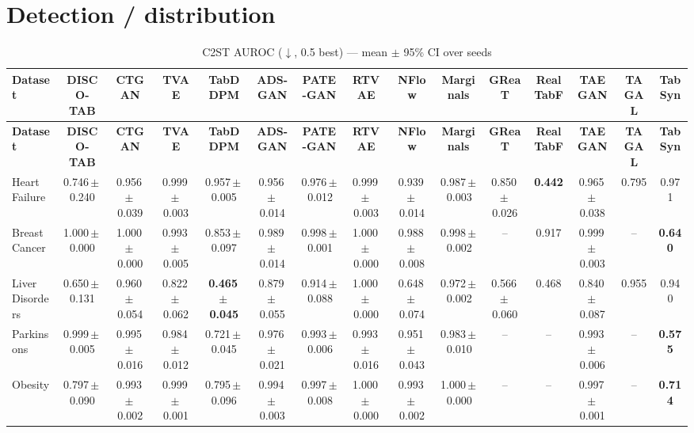 \documentclass[8pt]{extarticle}
\begin{document}
\section*{Detection / distribution}
\begin{longtable}{l*{14}{c}}
\caption{C2ST AUROC ($\downarrow$, 0.5 best) --- mean $\pm$ 95\% CI over seeds}\\
\toprule
\textbf{Dataset} & \textbf{DISCO-TAB} & \textbf{CTGAN} & \textbf{TVAE} & \textbf{TabDDPM} & \textbf{ADS-GAN} & \textbf{PATE-GAN} & \textbf{RTVAE} & \textbf{NFlow} & \textbf{Marginals} & \textbf{GReaT} & \textbf{RealTabF} & \textbf{TAEGAN} & \textbf{TAGAL} & \textbf{TabSyn} \\
\midrule
\endfirsthead
\toprule
\textbf{Dataset} & \textbf{DISCO-TAB} & \textbf{CTGAN} & \textbf{TVAE} & \textbf{TabDDPM} & \textbf{ADS-GAN} & \textbf{PATE-GAN} & \textbf{RTVAE} & \textbf{NFlow} & \textbf{Marginals} & \textbf{GReaT} & \textbf{RealTabF} & \textbf{TAEGAN} & \textbf{TAGAL} & \textbf{TabSyn} \\
\midrule
\endhead
\bottomrule
\endfoot
Heart Failure & 0.746\,$\pm$\,0.240 & 0.956\,$\pm$\,0.039 & 0.999\,$\pm$\,0.003 & 0.957\,$\pm$\,0.005 & 0.956\,$\pm$\,0.014 & 0.976\,$\pm$\,0.012 & 0.999\,$\pm$\,0.003 & 0.939\,$\pm$\,0.014 & 0.987\,$\pm$\,0.003 & 0.850\,$\pm$\,0.026 & \textbf{0.442} & 0.965\,$\pm$\,0.038 & 0.795 & 0.971 \\
Breast Cancer & 1.000\,$\pm$\,0.000 & 1.000\,$\pm$\,0.000 & 0.993\,$\pm$\,0.005 & 0.853\,$\pm$\,0.097 & 0.989\,$\pm$\,0.014 & 0.998\,$\pm$\,0.001 & 1.000\,$\pm$\,0.000 & 0.988\,$\pm$\,0.008 & 0.998\,$\pm$\,0.002 & -- & 0.917 & 0.999\,$\pm$\,0.003 & -- & \textbf{0.640} \\
Liver Disorders & 0.650\,$\pm$\,0.131 & 0.960\,$\pm$\,0.054 & 0.822\,$\pm$\,0.062 & \textbf{0.465\,$\pm$\,0.045} & 0.879\,$\pm$\,0.055 & 0.914\,$\pm$\,0.088 & 1.000\,$\pm$\,0.000 & 0.648\,$\pm$\,0.074 & 0.972\,$\pm$\,0.002 & 0.566\,$\pm$\,0.060 & 0.468 & 0.840\,$\pm$\,0.087 & 0.955 & 0.940 \\
Parkinsons & 0.999\,$\pm$\,0.005 & 0.995\,$\pm$\,0.016 & 0.984\,$\pm$\,0.012 & 0.721\,$\pm$\,0.045 & 0.976\,$\pm$\,0.021 & 0.993\,$\pm$\,0.006 & 0.993\,$\pm$\,0.016 & 0.951\,$\pm$\,0.043 & 0.983\,$\pm$\,0.010 & -- & -- & 0.993\,$\pm$\,0.006 & -- & \textbf{0.575} \\
Obesity & 0.797\,$\pm$\,0.090 & 0.993\,$\pm$\,0.002 & 0.999\,$\pm$\,0.001 & 0.795\,$\pm$\,0.096 & 0.994\,$\pm$\,0.003 & 0.997\,$\pm$\,0.008 & 1.000\,$\pm$\,0.000 & 0.993\,$\pm$\,0.002 & 1.000\,$\pm$\,0.000 & -- & -- & 0.997\,$\pm$\,0.001 & -- & \textbf{0.714} \\

\end{longtable}
\end{document}

